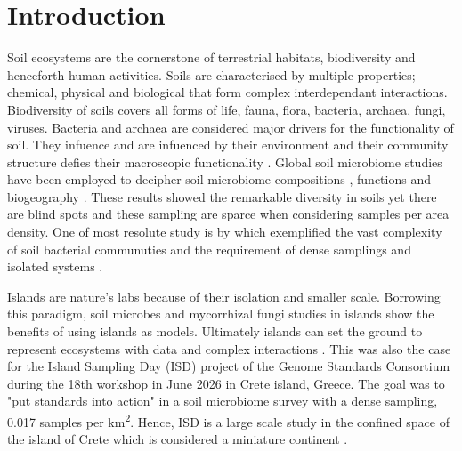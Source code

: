 \documentclass[unnumsec,webpdf,contemporary,large]{oup-authoring-template}%
\theoremstyle{thmstyleone}%
\theoremstyle{thmstyletwo}%
\theoremstyle{thmstylethree}%
\begin{document}

\maketitle

\section{Introduction}\label{intro}

Soil ecosystems are the cornerstone of terrestrial habitats, biodiversity and henceforth human activities.
Soils are characterised by multiple properties; chemical, physical and biological that 
form complex interdependant interactions. Biodiversity of soils covers
all forms of life, fauna, flora, bacteria, archaea, fungi, viruses. 
Bacteria and archaea are considered major drivers for the functionality of soil.
They infuence and are infuenced by their environment and their community structure 
defies their macroscopic functionality \cite{Bahram2018}.
Global soil microbiome studies have been employed to decipher soil microbiome
compositions \cite{thompson2017a-communal, Delgado-Baquerizo2018, Labouyrie2023},
functions \cite{Bahram2018} and biogeography \cite{Martiny2006, Guerra2020}.
These results showed the remarkable diversity in soils yet there are blind spots \cite{Guerra2020}
and these sampling are sparce when considering samples per area density. One of most resolute
study is by \cite{Karimi2020} which exemplified the 
vast complexity of soil bacterial communuties and the requirement of
dense samplings and isolated systems \cite{Dini-Andreote2021}.

Islands are nature's labs \cite{Whittaker2017} because of their isolation and smaller scale.
Borrowing this paradigm, soil microbes \cite{Li2020} and mycorrhizal fungi \cite{Delavaux2021} studies
in islands show the benefits of using islands as models. Ultimately islands can
set the ground to represent ecosystems with data and complex interactions \cite{Davies2016}.
This was also the case for the Island Sampling Day (ISD) project \cite{holm2024}
of the Genome Standards Consortium \cite{Field2011}
during the 18th workshop in June 2026 in Crete island, Greece. The goal was to "put standards into action"
in a soil microbiome survey with a dense sampling, 0.017 samples per km\textsuperscript{2}.
Hence, ISD is a large scale study in the confined space of the island of Crete which 
is considered a miniature continent \cite{Vogiatzakis2008_crete}.
\end{document}
